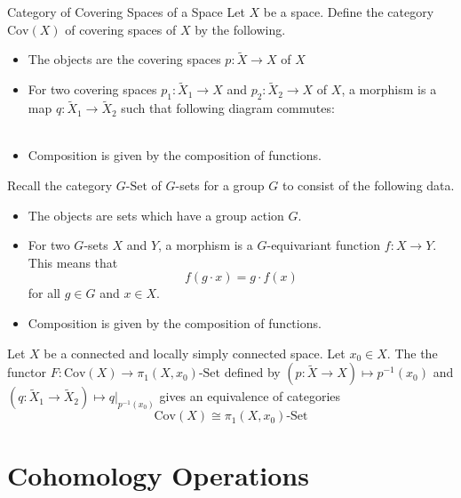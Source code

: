 \documentclass[a4paper]{article}
\begin{document}
\begin{defn}{Category of Covering Spaces of a Space}{} Let $X$ be a space. Define the category $\text{Cov}(X)$ of covering spaces of $X$ by the following. 
\begin{itemize}
\item The objects are the covering spaces $p:\tilde{X}\to X$ of $X$
\item For two covering spaces $p_1:\tilde{X}_1\to X$ and $p_2:\tilde{X}_2\to X$ of $X$, a morphism is a map $q:\tilde{X}_1\to\tilde{X}_2$ such that following diagram commutes: \\~\\
\item Composition is given by the composition of functions. 
\end{itemize}
\end{defn}

Recall the category $G\text{-Set}$ of $G$-sets for a group $G$ to consist of the following data. 
\begin{itemize}
\item The objects are sets which have a group action $G$. 
\item For two $G$-sets $X$ and $Y$, a morphism is a $G$-equivariant function $f:X\to Y$. This means that $$f(g\cdot x)=g\cdot f(x)$$ for all $g\in G$ and $x\in X$. 
\item Composition is given by the composition of functions. 
\end{itemize}

\begin{thm}{}{} Let $X$ be a connected and locally simply connected space. Let $x_0\in X$. The the functor $F:\text{Cov}(X)\to\pi_1(X,x_0)\text{-Set}$ defined by $\left(p:\tilde{X}\to X\right)\mapsto p^{-1}(x_0)$ and $\left(q:\tilde{X}_1\to\tilde{X}_2\right)\mapsto q|_{p^{-1}(x_0)}$ gives an equivalence of categories $$\text{Cov}(X)\cong\pi_1(X,x_0)\text{-Set}$$
\end{thm}

\pagebreak
\section{Cohomology Operations}
\end{document}
